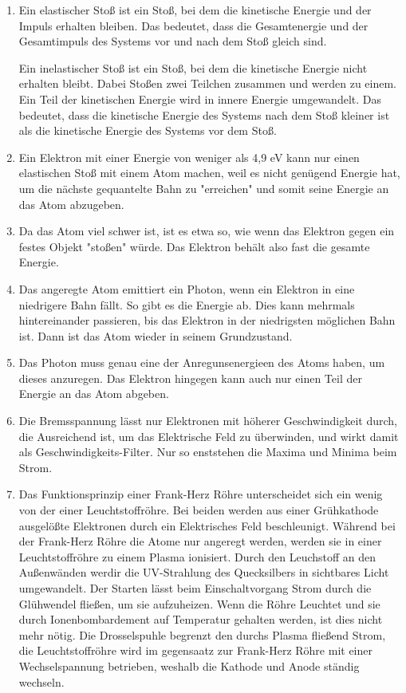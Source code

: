 \documentclass[11pt, a4paper]{article}
\begin{document}
    \begin{enumerate}
        \item Ein elastischer Stoß ist ein Stoß, bei dem die kinetische Energie und der Impuls erhalten bleiben. Das bedeutet, dass die Gesamtenergie und der Gesamtimpuls des Systems vor und nach dem Stoß gleich sind.

        Ein inelastischer Stoß ist ein Stoß, bei dem die kinetische Energie nicht erhalten bleibt. Dabei Stoßen zwei Teilchen zusammen und werden zu einem. Ein Teil der kinetischen Energie wird in innere Energie umgewandelt. Das bedeutet, dass die kinetische Energie des Systems nach dem Stoß kleiner ist als die kinetische Energie des Systems vor dem Stoß.

        \item Ein Elektron mit einer Energie von weniger als 4,9 eV kann nur einen elastischen Stoß mit einem Atom machen, weil es nicht genügend Energie hat, um die nächste gequantelte Bahn zu "erreichen" und somit seine Energie an das Atom abzugeben.
        \item Da das Atom viel schwer ist, ist es etwa so, wie wenn das Elektron gegen ein festes Objekt "stoßen" würde. Das Elektron behält also fast die gesamte Energie.
        \item Das angeregte Atom emittiert ein Photon, wenn ein Elektron in eine niedrigere Bahn fällt. So gibt es die Energie ab. Dies kann mehrmals hintereinander passieren, bis das Elektron in der niedrigsten möglichen Bahn ist. Dann ist das Atom wieder in seinem Grundzustand.
        \item Das Photon muss genau eine der Anregunsenergieen des Atoms haben, um dieses anzuregen. Das Elektron hingegen kann auch nur einen Teil der Energie an das Atom abgeben.
        \item Die Bremsspannung lässt nur Elektronen mit höherer Geschwindigkeit durch, die Ausreichend ist, um das Elektrische Feld zu überwinden, und wirkt damit als Geschwindigkeits-Filter. Nur so enststehen die Maxima und Minima beim Strom.
        \item Das Funktionsprinzip einer Frank-Herz Röhre unterscheidet sich ein wenig von der einer Leuchtstoffröhre. Bei beiden werden aus einer Grühkathode ausgelößte Elektronen durch ein Elektrisches Feld beschleunigt. Während bei der Frank-Herz Röhre die Atome nur angeregt werden, werden sie in einer Leuchtstoffröhre zu einem Plasma ionisiert. Durch den Leuchstoff an den Außenwänden werdir die UV-Strahlung des Quecksilbers in sichtbares Licht umgewandelt. Der Starten lässt beim Einschaltvorgang Strom durch die Glühwendel fließen, um sie aufzuheizen. Wenn die Röhre Leuchtet und sie durch Ionenbombardement auf Temperatur gehalten werden, ist dies nicht mehr nötig. Die Drosselspuhle begrenzt den durchs Plasma fließend Strom, die Leuchtstoffröhre wird im gegensaatz zur Frank-Herz Röhre mit einer Wechselspannung betrieben, weshalb die Kathode und Anode ständig wechseln.

\end{enumerate}
\end{document}
